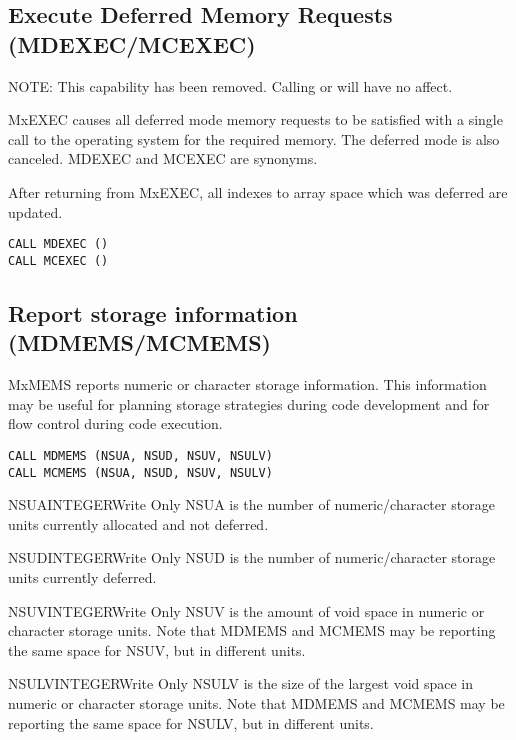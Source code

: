 \subsection{Execute Deferred Memory Requests (MDEXEC/MCEXEC)}
NOTE: This capability has been removed.  Calling  or  will have no affect.

MxEXEC causes all deferred mode memory requests to be satisfied
with a single call to the operating system for the required memory. The
deferred mode is also canceled. MDEXEC and MCEXEC are synonyms.

After returning from MxEXEC, all indexes to array space which was
deferred are updated.
\begin{verbatim}
CALL MDEXEC ()
CALL MCEXEC ()
\end{verbatim}

\subsection{Report storage information (MDMEMS/MCMEMS)}
MxMEMS reports numeric or character storage information. This information
may be useful for planning storage strategies during code development
and for flow control during code execution.
\begin{verbatim}
CALL MDMEMS (NSUA, NSUD, NSUV, NSULV)
CALL MCMEMS (NSUA, NSUD, NSUV, NSULV)
\end{verbatim}

\begin{argy}{NSUA}{INTEGER}{Write Only}
NSUA is the number of numeric/character storage units currently allocated
and not deferred.
\end{argy}

\begin{argy}{NSUD}{INTEGER}{Write Only}
NSUD is the number of numeric/character storage units currently deferred.
\end{argy}

\begin{argy}{NSUV}{INTEGER}{Write Only}
NSUV is the amount of void space in numeric or character storage units. Note
that MDMEMS and MCMEMS may be reporting the same space for NSUV, but in
different units.
\end{argy}

\begin{argy}{NSULV}{INTEGER}{Write Only}
NSULV is the size of the largest void space in numeric or character storage
units. Note that MDMEMS and MCMEMS may be reporting the same space for
NSULV, but in different units.
\end{argy}

